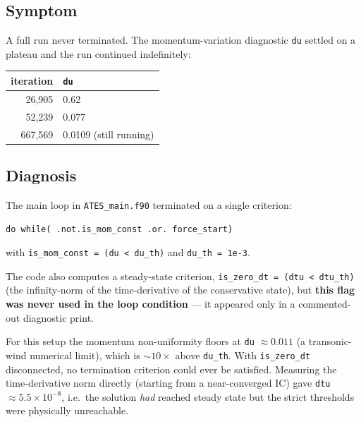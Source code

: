 \documentclass[english,a4paper]{kiseon_memo}
\begin{document}
\subsection{Symptom}
A full run never terminated. The momentum-variation diagnostic \texttt{du} settled
on a plateau and the run continued indefinitely:
\begin{center}
\begin{tabular}{rl}
\toprule
iteration & \texttt{du} \\
\midrule
26{,}905  & 0.62 \\
52{,}239  & 0.077 \\
667{,}569 & 0.0109 (still running) \\
\bottomrule
\end{tabular}
\end{center}

\subsection{Diagnosis}
The main loop in \texttt{ATES\_main.f90} terminated on a single criterion:
\begin{lstlisting}
do while( .not.is_mom_const .or. force_start)
\end{lstlisting}
with \verb|is_mom_const = (du < du_th)| and \verb|du_th = 1e-3|.

The code also computes a steady-state criterion,
\verb|is_zero_dt = (dtu < dtu_th)| (the infinity-norm of the time-derivative of the
conservative state), but \textbf{this flag was never used in the loop condition} ---
it appeared only in a commented-out diagnostic print.

For this setup the momentum non-uniformity floors at \verb|du| $\approx 0.011$ (a
transonic-wind numerical limit), which is $\sim 10\times$ above \verb|du_th|. With
\verb|is_zero_dt| disconnected, no termination criterion could ever be satisfied.
Measuring the time-derivative norm directly (starting from a near-converged IC)
gave \verb|dtu| $\approx 5.5 \times 10^{-8}$, i.e.\ the solution \emph{had} reached
steady state but the strict thresholds were physically unreachable.
\end{document}
